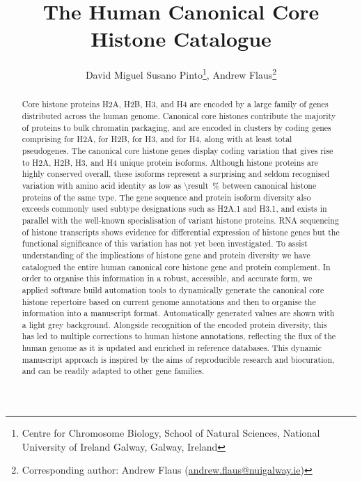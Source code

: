 \documentclass[a4paper,10pt,oneside,onecolumn,article]{memoir}
\title{The Human Canonical Core Histone Catalogue}
\author{David Miguel Susano Pinto\thanks{Centre for Chromosome
    Biology, School of Natural Sciences, National University of
    Ireland Galway, Galway, Ireland},
    Andrew Flaus\thanksmark{1}\thanks{Corresponding author: Andrew Flaus
    (\href{mailto:andrew.flaus@nuigalway.ie}{andrew.flaus@nuigalway.ie})}}
\date{}
\begin{document}
  \maketitle

  \begin{abstract}
    \noindent
    Core histone proteins H2A, H2B, H3, and H4 are encoded
    by a large family of genes distributed across the human genome.
    Canonical core histones contribute the majority of proteins to bulk chromatin packaging,
    and are encoded in \NumberOfClusters{} clusters
    by \TotalCoreCodingGenes{} coding genes comprising
    \HTwoACodingGenes{} for H2A,
    \HTwoBCodingGenes{} for H2B,
    \HThreeCodingGenes{} for H3,
    and \HFourCodingGenes{} for H4,
    along with at least \TotalCorePseudoGenes{} total pseudogenes.
    The canonical core histone genes display coding variation that gives rise to
    \HTwoAUniqueProteins{} H2A, \HTwoBUniqueProteins{} H2B,
    \HThreeUniqueProteins{} H3, and \HFourUniqueProteins{} H4 unique protein isoforms.
    Although histone proteins are highly conserved overall,
    these isoforms represent a surprising and seldom recognised variation
    with amino acid identity as low as
     \SI{\result}{\percent}
    between canonical histone proteins of the same type.
    The gene sequence and protein isoform diversity
    also exceeds commonly used subtype designations such as H2A.1 and H3.1,
    and exists in parallel with the well-known specialisation of variant histone proteins.
    RNA sequencing of histone transcripts shows evidence for
    differential expression of histone genes
    but the functional significance of this variation has not yet been investigated.
    To assist understanding of the implications of histone gene and protein diversity
    we have catalogued the entire human canonical core
    histone gene and protein complement.
    In order to organise this information in a
    robust, accessible, and accurate form,
    we applied software build automation tools to
    dynamically generate the canonical core histone repertoire
    based on current genome annotations
    and then to organise the information into a manuscript format.
    Automatically generated values are shown with a light grey background.
    Alongside recognition of the encoded protein diversity,
    this has led to multiple corrections to human histone annotations,
    reflecting the flux of the human genome as it is updated and
    enriched in reference databases.
    This dynamic manuscript approach is inspired by the aims of reproducible research and biocuration,
    and can be readily adapted to other gene families.
  \end{abstract}
\end{document}
